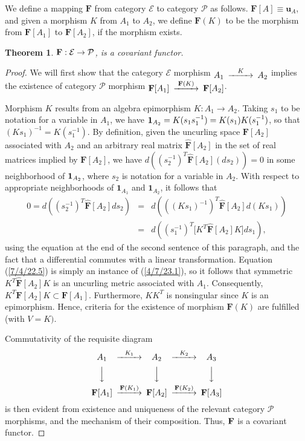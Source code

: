 \documentclass{amsart}
\numberwithin{equation}{section}
\newtheorem{theorem}{Theorem}
\theoremstyle{definition}
\numberwithin{theorem}{section}
\begin{document}
We define a mapping $\mathbf{F}$ from category $\mathcal{E}$ to category $\mathcal{P}$ as follows.  $\mathbf{F}[
A] \equiv \mathbf{u}_A$, and given a morphism $K$ from $A_1$ to $A_2$, we define $\mathbf{F}(K)$ to be the morphism from $\mathbf{F}[A_1]$ to $\mathbf{F}[A_2]$, if the morphism exists.   


\begin{theorem}\label{6/13/22.1}  ${\bf F}: \mathcal{E}\rightarrow \mathcal{P}$, is a covariant functor. 
 \end{theorem}
 \begin{proof}
We will first show that the category $\mathcal{E}$ morphism $ \begin{CD}  A_1 @>K>> A_2\end{CD}$ implies the existence of category $\mathcal{P}$ morphism $ \begin{CD}  {\bf F}[A_1] @>{\bf F}(K)>> {\bf F}[A_2]\end{CD}$.

Morphism $K$ results from an algebra epimorphism $K:A_1\rightarrow A_2$.   Taking $s_1$ to be notation for a variable in $A_1$, we have ${\bf 1}_{A_2} = K(s_1s_1^{-1}) = K(s_1)K(s_1^{-1})$, so that $(Ks_1)^{-1} = K(s_1^{-1})$.  By definition, given the uncurling space $\mathbf{F}[A_2]$ associated with $A_2$ and an arbitrary real matrix  $\hat{\mathbf{F}}[A_2]$ in the set of real matrices implied by $\mathbf{F}[A_2]$, we have $d\left((s_2^{-1})^T\hat{\mathbf{F}}[A_2] (ds_2)\right) = 0$ in some neighborhood of ${\bf 1}_{A_2}$, where $s_2$ is notation for a variable in $A_2$.   With respect to appropriate neighborhoods of $\mathbf{1}_{A_1}$ and $\mathbf{1}_{A_2}$, it follows that \begin{eqnarray}\nonumber 0 = d\left((s_2^{-1})^T\hat{\mathbf{F}}[A_2] ds_2\right) &=&  d\left(((Ks_1)^{-1})^T\hat{\mathbf{F}}[A_2] d(Ks_1)\right) \\  &=& d\left((s_1^{-1})^T \big[K^T \hat{\mathbf{F}}[A_2]K\big]ds_1\right), \label{7/4/22.5}  \end{eqnarray}   using the equation at the end of the second sentence of this paragraph, and the fact that a differential commutes with a linear transformation.  Equation (\ref{7/4/22.5}) is simply an instance of (\ref{4/7/23.1}), so it follows that symmetric $K^T \hat{\mathbf{F}}[A_2]K$ is an uncurling metric associated with $A_1$.  Consequently, $K^T\mathbf{F}[A_2]K\subset \mathbf{F}[A_1]$.  Furthermore, $KK^T$ is nonsingular since $K$ is an epimorphism.  Hence, criteria for the existence of morphism $\mathbf{F}(K)$ are fulfilled (with $V=K)$.

Commutativity of the requisite diagram
  \[  \begin{CD}  
A_1 @>K_1>> A_2 @>K_2>> A_3\\
 @VVV   @VVV  @VVV\\
 {\bf F}[A_1]   @>{\bf F}(K_1)>>  {\bf F}[A_2]  @>{\bf F}(K_2)>>  {\bf F}[A_3] \\ 
 \end{CD} \]
is then evident from existence and uniqueness of the relevant category $\mathcal{P}$ morphisms, and the mechanism of their composition.  Thus, ${\bf F}$ is a covariant functor. 
\end{proof}
\end{document}

